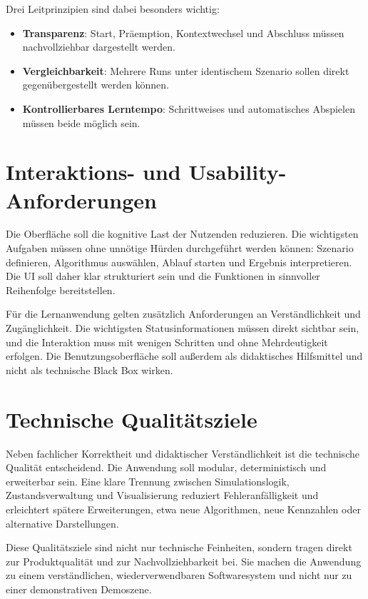 Drei Leitprinzipien sind dabei besonders wichtig:

\begin{itemize}
    \item \textbf{Transparenz}: Start, Präemption, Kontextwechsel und Abschluss müssen nachvollziehbar dargestellt werden.
    \item \textbf{Vergleichbarkeit}: Mehrere Runs unter identischem Szenario sollen direkt gegenübergestellt werden können.
    \item \textbf{Kontrollierbares Lerntempo}: Schrittweises und automatisches Abspielen müssen beide möglich sein.
\end{itemize}

\section{Interaktions- und Usability-Anforderungen}

Die Oberfläche soll die kognitive Last der Nutzenden reduzieren. Die wichtigsten Aufgaben müssen ohne unnötige Hürden durchgeführt werden können: Szenario definieren, Algorithmus auswählen, Ablauf starten und Ergebnis interpretieren. Die UI soll daher klar strukturiert sein und die Funktionen in sinnvoller Reihenfolge bereitstellen.

Für die Lernanwendung gelten zusätzlich Anforderungen an Verständlichkeit und Zugänglichkeit. Die wichtigsten Statusinformationen müssen direkt sichtbar sein, und die Interaktion muss mit wenigen Schritten und ohne Mehrdeutigkeit erfolgen. Die Benutzungsoberfläche soll außerdem als didaktisches Hilfsmittel und nicht als technische Black Box wirken.

\section{Technische Qualitätsziele}

Neben fachlicher Korrektheit und didaktischer Verständlichkeit ist die technische Qualität entscheidend. Die Anwendung soll modular, deterministisch und erweiterbar sein. Eine klare Trennung zwischen Simulationslogik, Zustandsverwaltung und Visualisierung reduziert Fehleranfälligkeit und erleichtert spätere Erweiterungen, etwa neue Algorithmen, neue Kennzahlen oder alternative Darstellungen.

Diese Qualitätsziele sind nicht nur technische Feinheiten, sondern tragen direkt zur Produktqualität und zur Nachvollziehbarkeit bei. Sie machen die Anwendung zu einem verständlichen, wiederverwendbaren Softwaresystem und nicht nur zu einer demonstrativen Demoszene.
